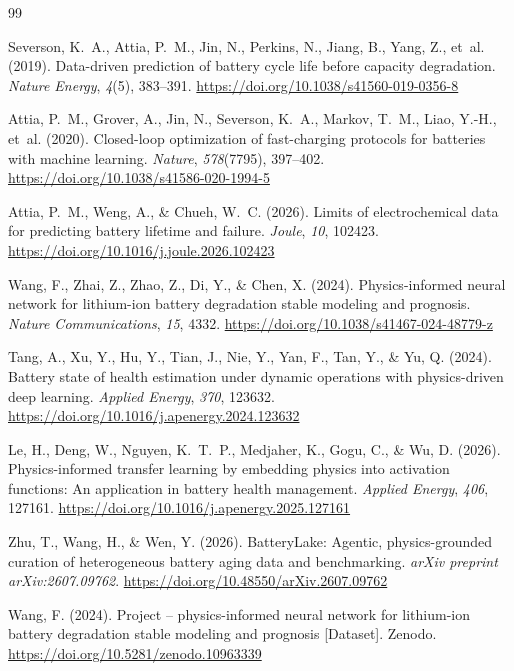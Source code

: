 \documentclass[preprint,12pt]{elsarticle}
\begin{document}
\begin{thebibliography}{99}

Severson, K.~A., Attia, P.~M., Jin, N., Perkins, N., Jiang, B., Yang, Z., et~al. (2019). Data-driven prediction of battery cycle life before capacity degradation. \textit{Nature Energy}, \textit{4}(5), 383--391. \url{https://doi.org/10.1038/s41560-019-0356-8}

Attia, P.~M., Grover, A., Jin, N., Severson, K.~A., Markov, T.~M., Liao, Y.-H., et~al. (2020). Closed-loop optimization of fast-charging protocols for batteries with machine learning. \textit{Nature}, \textit{578}(7795), 397--402. \url{https://doi.org/10.1038/s41586-020-1994-5}

Attia, P.~M., Weng, A., \& Chueh, W.~C. (2026). Limits of electrochemical data for predicting battery lifetime and failure. \textit{Joule}, \textit{10}, 102423. \url{https://doi.org/10.1016/j.joule.2026.102423}

Wang, F., Zhai, Z., Zhao, Z., Di, Y., \& Chen, X. (2024). Physics-informed neural network for lithium-ion battery degradation stable modeling and prognosis. \textit{Nature Communications}, \textit{15}, 4332. \url{https://doi.org/10.1038/s41467-024-48779-z}

Tang, A., Xu, Y., Hu, Y., Tian, J., Nie, Y., Yan, F., Tan, Y., \& Yu, Q. (2024). Battery state of health estimation under dynamic operations with physics-driven deep learning. \textit{Applied Energy}, \textit{370}, 123632. \url{https://doi.org/10.1016/j.apenergy.2024.123632}

Le, H., Deng, W., Nguyen, K.~T.~P., Medjaher, K., Gogu, C., \& Wu, D. (2026). Physics-informed transfer learning by embedding physics into activation functions: An application in battery health management. \textit{Applied Energy}, \textit{406}, 127161. \url{https://doi.org/10.1016/j.apenergy.2025.127161}

Zhu, T., Wang, H., \& Wen, Y. (2026). BatteryLake: Agentic, physics-grounded curation of heterogeneous battery aging data and benchmarking. \textit{arXiv preprint arXiv:2607.09762}. \url{https://doi.org/10.48550/arXiv.2607.09762}

Wang, F. (2024). Project -- physics-informed neural network for lithium-ion battery degradation stable modeling and prognosis [Dataset]. Zenodo. \url{https://doi.org/10.5281/zenodo.10963339}


\end{thebibliography}
\end{document}
